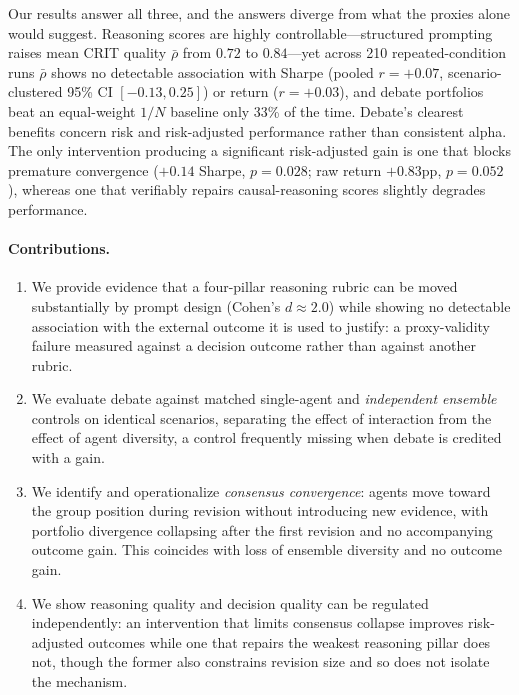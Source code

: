 \documentclass{article}
\begin{document}
Our results answer all three, and the answers diverge from what the proxies alone
would suggest. Reasoning scores are highly controllable---structured prompting raises
mean CRIT quality $\bar{\rho}$ from $0.72$ to $0.84$---yet across 210 repeated-condition runs $\bar{\rho}$ shows no detectable association with Sharpe (pooled $r{=}{+}0.07$, scenario-clustered 95\% CI $[-0.13,0.25]$) or return ($r{=}{+}0.03$), and debate portfolios beat an equal-weight
$1/N$ baseline only 33\% of the time. Debate's clearest benefits concern risk and risk-adjusted performance rather than consistent alpha. The only intervention producing a significant risk-adjusted gain is one that blocks premature convergence ($+0.14$ Sharpe, $p{=}0.028$; raw return $+0.83$pp, $p{=}0.052$), whereas one that verifiably repairs causal-reasoning scores slightly degrades performance.

\vspace{-2pt}
\paragraph{Contributions.}
\vspace{-4pt}
\begin{enumerate}[label=(\arabic*),leftmargin=2.2em,itemsep=1pt,topsep=2pt]
    \item We provide evidence that a four-pillar reasoning rubric can be moved
    substantially by prompt design (Cohen's $d{\approx}2.0$) while showing no detectable
    association with the external outcome it is used to justify: a proxy-validity failure measured against a decision outcome rather than against another rubric.
    \item We evaluate debate against matched single-agent and \emph{independent
    ensemble} controls on identical scenarios, separating the effect of interaction
    from the effect of agent diversity, a control frequently missing when
    debate is credited with a gain.
    \item We identify and operationalize \emph{consensus convergence}: agents move
    toward the group position during revision without introducing new evidence, with
    portfolio divergence collapsing after the first revision and no accompanying
    outcome gain. This coincides with loss of ensemble diversity and no outcome gain.
    \item We show reasoning quality and decision quality can be regulated independently: an intervention that limits consensus collapse improves risk-adjusted outcomes while one that repairs the weakest reasoning pillar does not, though the former also constrains revision size and so does not isolate the mechanism.
\end{enumerate}
\end{document}
